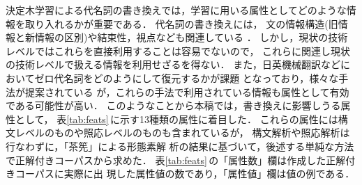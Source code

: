 決定木学習による代名詞の書き換えでは，学習に用いる属性としてどのような情
報を取り入れるかが重要である．
代名詞の書き換えには，
文の情報構造(旧情報と新情報の区別)や結束性，視点なども関連している
\cite{Kuno78,Kuno83,Mizutani83,Kamio85,Hinds86,Takami97}．
しかし，現状の技術レベルではこれらを直接利用することは容易でないので，
これらに関連し現状の技術レベルで扱える情報を利用せざるを得ない．
また，日英機械翻訳などにおいてゼロ代名詞をどのようにして復元するかが課題
となっており，様々な手法が提案されている
\cite{Fujisawa93,Kudo93,Nakaiwa93,Dosaka94,Ehara96,Murata96,Nakaiwa96}
が，これらの手法で利用されている情報も属性として有効である可能性が高い．
このようなことから本稿では，書き換えに影響しうる属性として，
表\ref{tab:feats}\,に示す13種類の属性に着目した．
これらの属性には構文レベルのものや照応レベルのものも含まれているが，
構文解析や照応解析は行なわずに，「茶筅」\cite{Matsumoto99}による形態素解
析の結果に基づいて，後述する単純な方法で正解付きコーパスから求めた．
表\ref{tab:feats}\,の「属性数」欄は作成した正解付きコーパスに実際に出
現した属性値の数であり，「属性値」欄は値の例である．
